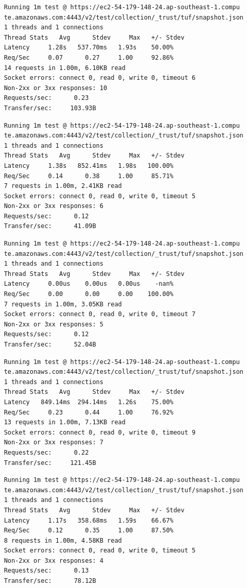 \documentclass[a4paper,12pt]{article}
\newcounter{subsubsubsection}[subsubsection]
\begin{document}
{{	
	\begin{verbatim}
	Running 1m test @ https://ec2-54-179-148-24.ap-southeast-1.compu
	te.amazonaws.com:4443/v2/test/collection/_trust/tuf/snapshot.json
	1 threads and 1 connections
	Thread Stats   Avg      Stdev     Max   +/- Stdev
	Latency     1.28s   537.70ms   1.93s    50.00%
	Req/Sec     0.07      0.27     1.00     92.86%
	14 requests in 1.00m, 6.10KB read
	Socket errors: connect 0, read 0, write 0, timeout 6
	Non-2xx or 3xx responses: 10
	Requests/sec:      0.23
	Transfer/sec:     103.93B
	\end{verbatim}
	\begin{verbatim}
	Running 1m test @ https://ec2-54-179-148-24.ap-southeast-1.compu
	te.amazonaws.com:4443/v2/test/collection/_trust/tuf/snapshot.json
	1 threads and 1 connections
	Thread Stats   Avg      Stdev     Max   +/- Stdev
	Latency     1.38s   852.41ms   1.98s   100.00%
	Req/Sec     0.14      0.38     1.00     85.71%
	7 requests in 1.00m, 2.41KB read
	Socket errors: connect 0, read 0, write 0, timeout 5
	Non-2xx or 3xx responses: 6
	Requests/sec:      0.12
	Transfer/sec:      41.09B
	\end{verbatim}
	\begin{verbatim}
	Running 1m test @ https://ec2-54-179-148-24.ap-southeast-1.compu
	te.amazonaws.com:4443/v2/test/collection/_trust/tuf/snapshot.json
	1 threads and 1 connections
	Thread Stats   Avg      Stdev     Max   +/- Stdev
	Latency     0.00us    0.00us   0.00us    -nan%
	Req/Sec     0.00      0.00     0.00    100.00%
	7 requests in 1.00m, 3.05KB read
	Socket errors: connect 0, read 0, write 0, timeout 7
	Non-2xx or 3xx responses: 5
	Requests/sec:      0.12
	Transfer/sec:      52.04B
	\end{verbatim}
	\newpage
	\begin{verbatim}
	Running 1m test @ https://ec2-54-179-148-24.ap-southeast-1.compu
	te.amazonaws.com:4443/v2/test/collection/_trust/tuf/snapshot.json
	1 threads and 1 connections
	Thread Stats   Avg      Stdev     Max   +/- Stdev
	Latency   849.14ms  294.14ms   1.26s    75.00%
	Req/Sec     0.23      0.44     1.00     76.92%
	13 requests in 1.00m, 7.13KB read
	Socket errors: connect 0, read 0, write 0, timeout 9
	Non-2xx or 3xx responses: 7
	Requests/sec:      0.22
	Transfer/sec:     121.45B
	\end{verbatim}
	\begin{verbatim}
	Running 1m test @ https://ec2-54-179-148-24.ap-southeast-1.compu
	te.amazonaws.com:4443/v2/test/collection/_trust/tuf/snapshot.json
	1 threads and 1 connections
	Thread Stats   Avg      Stdev     Max   +/- Stdev
	Latency     1.17s   358.68ms   1.59s    66.67%
	Req/Sec     0.12      0.35     1.00     87.50%
	8 requests in 1.00m, 4.58KB read
	Socket errors: connect 0, read 0, write 0, timeout 5
	Non-2xx or 3xx responses: 4
	Requests/sec:      0.13
	Transfer/sec:      78.12B
	\end{verbatim}
	\newpage
	
}}
\end{document}

